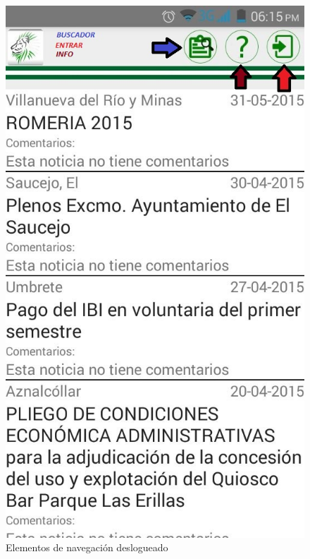 \begin{figure}
\centering
\includegraphics[scale=0.5]{./android/imagenes/botones1.jpg}
\caption{Elementos de navegación deslogueado}
\label{boton1}
\end{figure}

